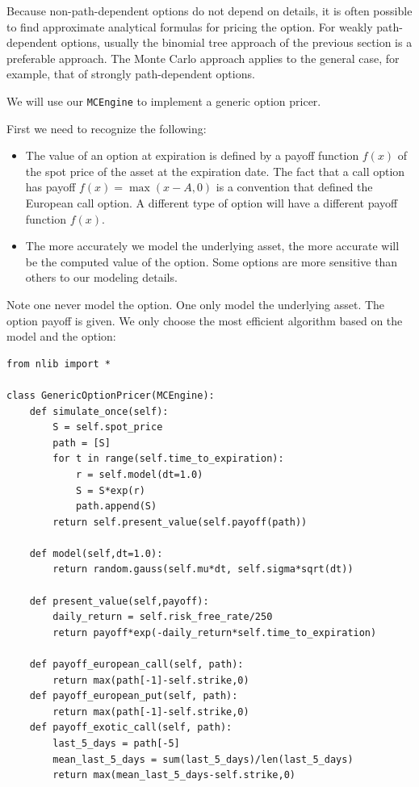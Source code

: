 \documentclass[justified,sixbynine]{tufte-book}
\def\ft{\small\tt}
\theoremstyle{plain}%
\theoremstyle{definition}
\theoremstyle{remark}
\begin{document}
\begin{fullwidth}
 Because non-path-dependent options do not depend on details, it is often possible to find approximate analytical formulas for pricing the option. For weakly path-dependent options, usually the binomial tree approach of the previous section is a preferable approach. The Monte Carlo approach applies to the general case, for example, that of strongly path-dependent options.

We will use our {\ft MCEngine} to implement a generic option pricer.

First we need to recognize the following:

\begin{itemize}
\item  The value of an option at expiration is defined by a payoff function
$f(x)$ of the spot price of the asset at the expiration date. The fact that
a call option has payoff $f(x)=\max (x-A,0)$ is a convention that defined the European call option.
A different type of option will have a different payoff function $f(x)$.

\item  The more accurately we model the underlying asset, the more accurate will be the computed value of the option. Some options are more sensitive than others to our modeling details.
\end{itemize}

Note one never model the option. One only model the underlying asset. The option payoff is given. We only choose the most efficient algorithm based on the model and the option:

\begin{lstlisting}[caption={in file: {\ft options.py}}]
from nlib import *

class GenericOptionPricer(MCEngine):
    def simulate_once(self):
        S = self.spot_price
        path = [S]
        for t in range(self.time_to_expiration):
            r = self.model(dt=1.0)
            S = S*exp(r)
            path.append(S)
        return self.present_value(self.payoff(path))

    def model(self,dt=1.0):
        return random.gauss(self.mu*dt, self.sigma*sqrt(dt))

    def present_value(self,payoff):
        daily_return = self.risk_free_rate/250
        return payoff*exp(-daily_return*self.time_to_expiration)

    def payoff_european_call(self, path):
        return max(path[-1]-self.strike,0)
    def payoff_european_put(self, path):
        return max(path[-1]-self.strike,0)
    def payoff_exotic_call(self, path):
        last_5_days = path[-5]
        mean_last_5_days = sum(last_5_days)/len(last_5_days)
        return max(mean_last_5_days-self.strike,0)


\end{lstlisting}
\end{fullwidth}
\end{document}

